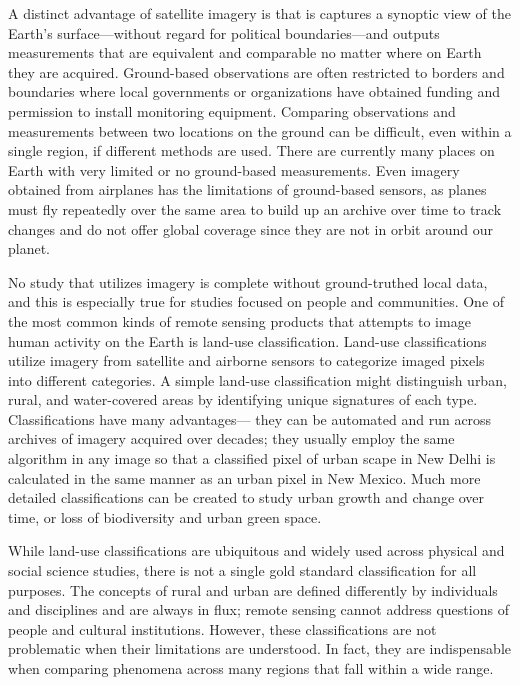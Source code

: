 \begin{itemize}
\begin{itemized}
A distinct advantage of satellite imagery is that is captures a synoptic view
of the Earth's surface—without regard for political boundaries—and outputs
measurements that are equivalent and comparable no matter where
on Earth they are acquired. Ground-based observations are often restricted
to borders and boundaries where local governments or organizations have
obtained funding and permission to install monitoring equipment. Comparing
observations and measurements between two locations on the
ground can be difficult, even within a single region, if different methods
are used. There are currently many places on Earth with very limited or no
ground-based measurements. Even imagery obtained from airplanes has
the limitations of ground-based sensors, as planes must fly repeatedly over
the same area to build up an archive over time to track changes and do not
offer global coverage since they are not in orbit around our planet.

No study that utilizes imagery is complete without ground-truthed local
data, and this is especially true for studies focused on people and communities.
One of the most common kinds of remote sensing products that
attempts to image human activity on the Earth is land-use classification.
Land-use classifications utilize imagery from satellite and airborne sensors
to categorize imaged pixels into different categories. A simple land-use
classification might distinguish urban, rural, and water-covered areas by
identifying unique signatures of each type. Classifications have many advantages—
they can be automated and run across archives of imagery acquired over decades; they usually employ the same algorithm in any image so that
a classified pixel of urban scape in New Delhi is calculated in the same manner
as an urban pixel in New Mexico. Much more detailed classifications
can be created to study urban growth and change over time, or loss of biodiversity
and urban green space.

While land-use classifications are ubiquitous and widely used across physical
and social science studies, there is not a single gold standard classification
for all purposes. The concepts of rural and urban are defined differently
by individuals and disciplines and are always in flux; remote sensing cannot
address questions of people and cultural institutions. However, these classifications
are not problematic when their limitations are understood. In fact,
they are indispensable when comparing phenomena across many regions
that fall within a wide range.


\end{itemized}
\end{itemize}
